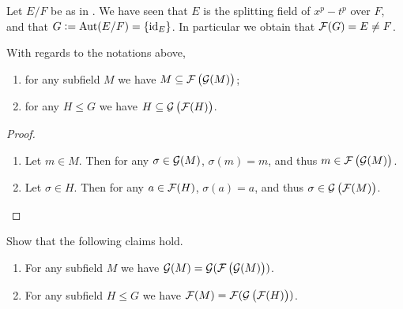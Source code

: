 \documentclass[11pt,a4paper]{article}
\begin{document}
\begin{example}
  \label{exmp:galois-correspondence-not-inverse-two}
  Let $E/F$ be as in .
  We have seen that $E$ is the splitting field of $x^p - t^p$
  over $F$, and that $G := \operatorname{Aut}(E/F) = \left\{\operatorname{id}_E\right\}$.
  In particular we obtain that $\mathcal F(G) = E \neq F$.
\end{example}

\begin{proposition}
  With regards to the notations above,
  \begin{enumerate}
    \item[(1)] for any subfield $M$ we have $M \subseteq \FF\del{\GG(M)}$;
    \item[(2)] for any $H \leqslant G$ we have $H \subseteq \GG\del{\FF(H)}$.
  \end{enumerate}
\end{proposition}
\begin{proof} \phantom{}
  \begin{enumerate}
    \item[(1)] Let $m \in M$.
      Then for any $\sigma \in \mathcal G(M)$, $\sigma(m) = m$,
      and thus $m \in \FF\del{\GG(M)}$.
    \item[(2)] Let $\sigma \in H$.
      Then for any $a \in \mathcal F(H)$, $\sigma(a) = a$,
      and thus $\sigma \in \GG\del{\FF(M)}$.
  \end{enumerate}
\end{proof}

\begin{exercise}
  Show that the following claims hold.
  \begin{enumerate}
    \item[(1)] For any subfield $M$
      we have $\GG(M) = \GG(\FF\del{\GG(M)})$.
    \item[(2)] For any subfield $H \leqslant G$
      we have $\FF(M) = \FF(\GG\del{\FF(H)})$.
  \end{enumerate}
\end{exercise}
\end{document}
